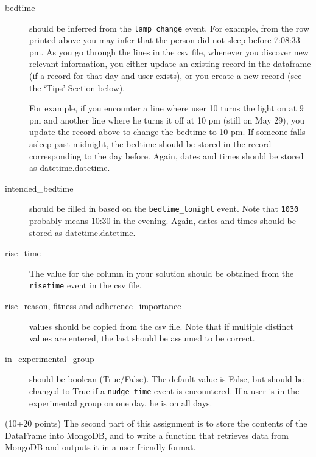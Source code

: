 \documentclass[a4paper]{report}
\theoremstyle{definition}
\begin{document}
\begin{description}
	\item[bedtime] should be inferred from the \texttt{\small lamp\_change}	event. For example, from the row printed above you may infer that the person did not sleep before 7:08:33 pm. As you go through the lines in the csv file, whenever you discover new relevant information, you either update an existing record in the dataframe (if a record for that day and user exists), or you create a new record (see the `Tips' Section below).
	
	For example, if you encounter a line where user 10 turns the light on at 9 pm and another line where he turns it off at 10 pm (still on May 29), you update the record above to change the bedtime to 10 pm. If someone falls asleep past midnight, the bedtime should be stored in the record corresponding to the day before. Again, dates and times should be stored as datetime.datetime.
		
	\item[intended\_bedtime] should be filled in based on the \texttt{\small bedtime\_tonight} event.  Note that \texttt{\small 1030} probably means 10:30 in the evening. Again, dates and times should be stored as datetime.datetime.
	
	\item[rise\_time] The value for the column in your solution should be obtained from the \texttt{\small risetime} event in the csv file.
	
	\item[rise\_reason, fitness and adherence\_importance] values should be copied from the csv file. Note that if multiple distinct values are entered, the last should be assumed to be correct.
	
	\item[in\_experimental\_group] should be boolean (True/False). The default value is False, but should be changed to True if a \texttt{\small nudge\_time} event is encountered.  If a user is in the experimental	group on one day, he is on all days.
\end{description}

\newpage

(10+20 points) The second part of this assignment is to store the contents of the DataFrame into MongoDB, and to write a function that retrieves data from MongoDB and outputs it in a user-friendly format.
	
\end{document}
